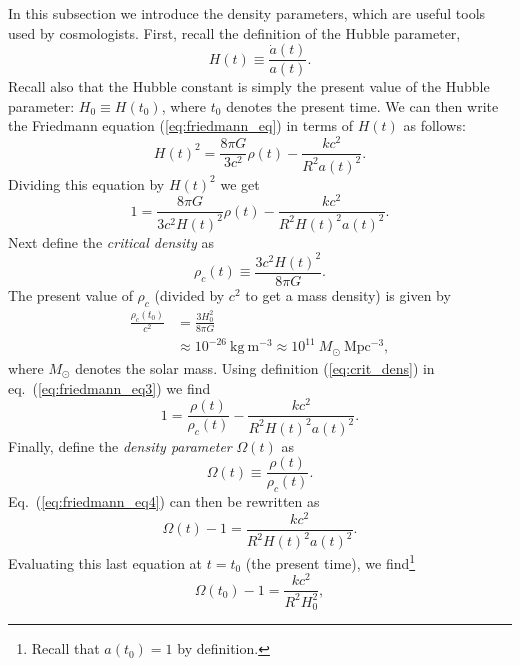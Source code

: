 In this subsection we introduce the density parameters, which are useful tools used by cosmologists. First, recall the definition of the Hubble parameter,
\begin{equation}
H(t)\equiv \frac{\dot{a}(t)}{a(t)}.
\end{equation}
Recall also that the Hubble constant is simply the present value of the Hubble parameter: $H_0\equiv H(t_0)$, where $t_0$ denotes the present time. We can then write the Friedmann equation (\ref{eq:friedmann_eq}) in terms of $H(t)$ as follows:
\begin{equation}
H(t)^2= \frac{8\pi G}{3c^2}\rho(t)-\frac{kc^2}{R^2a(t)^2}.
\end{equation}
Dividing this equation by $H(t)^2$ we get
\begin{equation} \label{eq:friedmann_eq3}
1= \frac{8\pi G}{3c^2H(t)^2}\rho(t)-\frac{kc^2}{R^2H(t)^2a(t)^2}.
\end{equation}
Next define the {\it critical density} as
\begin{equation} \label{eq:crit_dens}
\rho_c(t)\equiv \frac{3c^2H(t)^2}{8\pi G}.
\end{equation}
The present value of $\rho_c$ (divided by $c^2$ to get a mass density) is given by
\begin{equation}
\begin{split}
\frac{\rho_c(t_0)}{c^2}&=\frac{3H_0^2}{8\pi G}\\
&\approx 10^{-26}~\mathrm{kg~m^{-3}}\approx 10^{11}~M_{\odot}~\mathrm{Mpc^{-3}},
\end{split}
\end{equation}
where $M_{\odot}$ denotes the solar mass. Using definition (\ref{eq:crit_dens}) in eq.\ (\ref{eq:friedmann_eq3}) we find
\begin{equation} \label{eq:friedmann_eq4}
1=\frac{\rho(t)}{\rho_c(t)}-\frac{kc^2}{R^2H(t)^2a(t)^2}.
\end{equation}
Finally, define the {\it density parameter} $\Omega(t)$ as
\begin{equation}
\Omega(t)\equiv \frac{\rho(t)}{\rho_c(t)}.
\end{equation}
Eq.\ (\ref{eq:friedmann_eq4}) can then be rewritten as
\begin{equation}
\Omega(t)-1=\frac{kc^2}{R^2H(t)^2a(t)^2}.
\end{equation}
Evaluating this last equation at $t=t_0$ (the present time), we find\footnote{Recall that $a(t_0)=1$ by definition.}
\begin{equation}
\Omega(t_0)-1=\frac{kc^2}{R^2H_0^2},
\end{equation}
